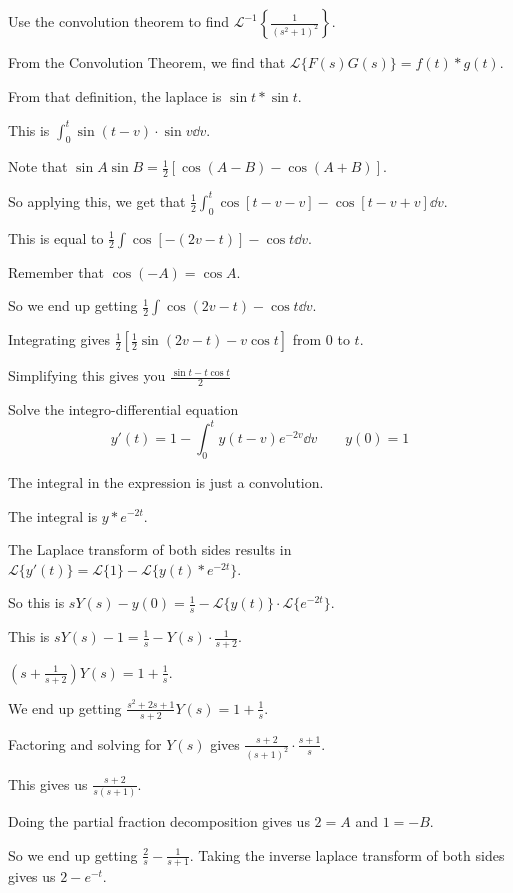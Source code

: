 \documentclass[../diffeq.tex]{subfiles}
\begin{document}
\begin{example}
    Use the convolution theorem to find $\mathcal{L}^{-1}\left\{\frac{1}{(s^2+1)^2}\right\}$.

    From the Convolution Theorem, we find that $\mathcal{L}\{F(s)G(s)\}=f(t)\ast g(t)$.

    From that definition, the laplace is $\sin t\ast \sin t$.

    This is $\int_0^t \sin(t-v)\cdot \sin v \dd v$.

    Note that $\sin A\sin B = \frac{1}{2}[\cos (A-B)-\cos (A+B)]$.

    So applying this, we get that $\frac{1}{2}\int_0^t \cos[t-v-v]-\cos [t-v+v]\dd v$.

    This is equal to $\frac{1}{2}\int \cos[-(2v-t)]-\cos t \dd v$.

    Remember that $\cos(-A)=\cos A$.

    So we end up getting $\frac{1}{2}\int\cos(2v-t)-\cos t \dd v$.

    Integrating gives $\frac{1}{2}[\frac{1}{2}\sin (2v-t)-v\cos t]$ from $0$ to $t$.

    Simplifying this gives you $\frac{\sin t-t\cos t}{2}$
\end{example}

\begin{example}
    Solve the integro-differential equation 
    \[ y'(t)=1-\int_0^t y(t-v)e^{-2v}\dd v \qquad y(0)=1 \]

    The integral in the expression is just a convolution.

    The integral is $y\ast e^{-2t}$.

    The Laplace transform of both sides results in $\mathcal{L}\{y'(t)\}=\mathcal{L}\{1\}-\mathcal{L}\{y(t)\ast e^{-2t}\}$.

    So this is $sY(s)-y(0)=\frac{1}{s}-\mathcal{L}\{y(t)\}\cdot\mathcal{L}\{e^{-2t}\}$.

    This is $sY(s)-1=\frac{1}{s}-Y(s)\cdot \frac{1}{s+2}$.

    $(s+\frac{1}{s+2})Y(s)=1+\frac{1}{s}$.

    We end up getting $\frac{s^2+2s+1}{s+2}Y(s)=1+\frac{1}{s}$.

    Factoring and solving for $Y(s)$ gives $\frac{s+2}{(s+1)^2}\cdot \frac{s+1}{s}$.

    This gives us $\frac{s+2}{s(s+1)}$.

    Doing the partial fraction decomposition gives us $2=A$ and $1=-B$.

    So we end up getting $\frac{2}{s}-\frac{1}{s+1}$. Taking the inverse laplace transform of both sides gives us $2-e^{-t}$.
\end{example}
\end{document}
